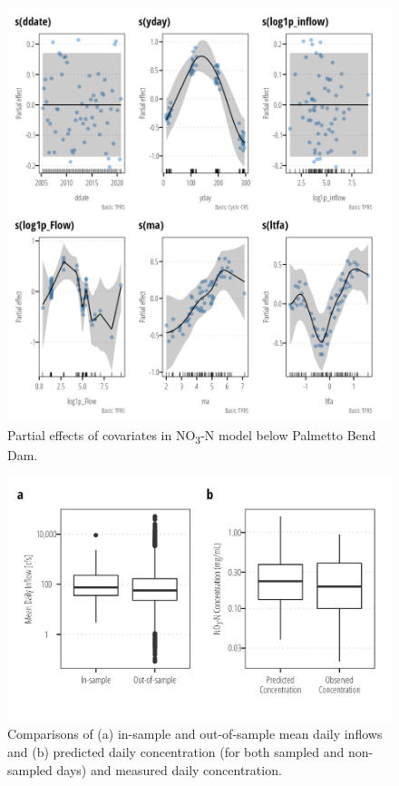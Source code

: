 \documentclass[
]{article}
\begin{document}
\begin{figure}[h]

{\centering \includegraphics{model_assessment_files/figure-pdf/unnamed-chunk-65-1.png}

}

\caption{Partial effects of covariates in NO\textsubscript{3}-N model
below Palmetto Bend Dam.}

\end{figure}

\begin{figure}[h]

{\centering \includegraphics{model_assessment_files/figure-pdf/unnamed-chunk-66-1.png}

}

\caption{Comparisons of (a) in-sample and out-of-sample mean daily
inflows and (b) predicted daily concentration (for both sampled and
non-sampled days) and measured daily concentration.}

\end{figure}
\end{document}
